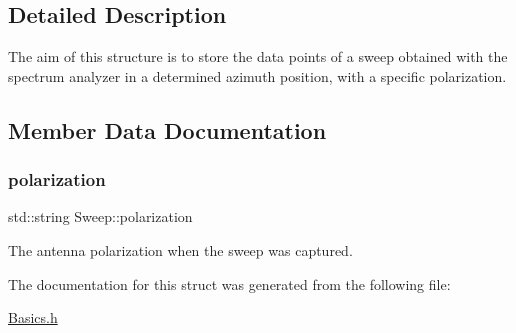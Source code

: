 \subsection{Detailed Description}
The aim of this structure is to store the data points of a sweep obtained with the spectrum analyzer in a determined azimuth position, with a specific polarization. 

\subsection{Member Data Documentation}
\mbox{\label{structSweep_a3484c258fdff60e1c109df92a1ba9ae7}} 
\subsubsection{\texorpdfstring{polarization}{polarization}}
{\footnotesize\ttfamily std\+::string Sweep\+::polarization}

The antenna polarization when the sweep was captured. 

The documentation for this struct was generated from the following file\+:\begin{DoxyCompactItemize}
\item 
\hyperlink{Basics_8h}{Basics.\+h}\end{DoxyCompactItemize}
